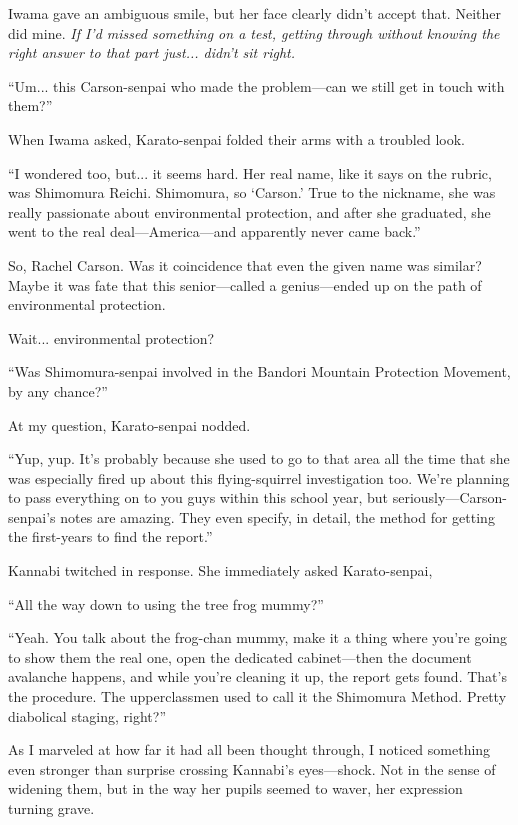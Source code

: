 \documentclass[
    a4paper,
    12pt,
    twoside,
    openany,
    UTF8,
    fontset=windows
]{ctexbook}
\begin{document}
Iwama gave an ambiguous smile, but her face clearly didn't accept that. Neither did mine. \textit{If I'd missed something on a test, getting through without knowing the right answer to that part just... didn't sit right.}

``Um... this Carson-senpai who made the problem---can we still get in touch with them?''

When Iwama asked, Karato-senpai folded their arms with a troubled look.

``I wondered too, but... it seems hard. Her real name, like it says on the rubric, was Shimomura Reichi. Shimomura, so `Carson.' True to the nickname, she was really passionate about environmental protection, and after she graduated, she went to the real deal---America---and apparently never came back.''

So, Rachel Carson. Was it coincidence that even the given name was similar? Maybe it was fate that this senior---called a genius---ended up on the path of environmental protection.

Wait... environmental protection?

``Was Shimomura-senpai involved in the Bandori Mountain Protection Movement, by any chance?''

At my question, Karato-senpai nodded.

``Yup, yup. It's probably because she used to go to that area all the time that she was especially fired up about this flying-squirrel investigation too. We're planning to pass everything on to you guys within this school year, but seriously---Carson-senpai's notes are amazing. They even specify, in detail, the method for getting the first-years to find the report.''

Kannabi twitched in response. She immediately asked Karato-senpai,

``All the way down to using the tree frog mummy?''

``Yeah. You talk about the frog-chan mummy, make it a thing where you're going to show them the real one, open the dedicated cabinet---then the document avalanche happens, and while you're cleaning it up, the report gets found. That's the procedure. The upperclassmen used to call it the Shimomura Method. Pretty diabolical staging, right?''

As I marveled at how far it had all been thought through, I noticed something even stronger than surprise crossing Kannabi's eyes---shock. Not in the sense of widening them, but in the way her pupils seemed to waver, her expression turning grave.
\end{document}
